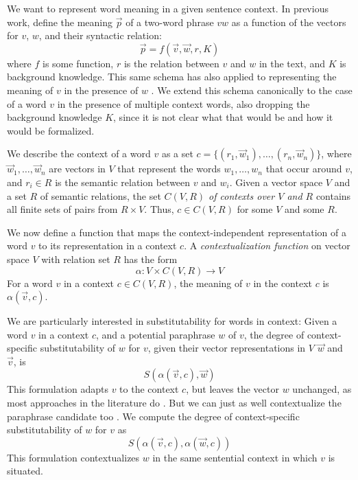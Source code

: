 We want to represent word meaning in a given sentence context.
In previous work, \citet{MitchellLapata:08} define the meaning $\vec p$ of a
two-word phrase $vw$ as a function of the vectors for $v$, $w$, and their
syntactic relation:
\[\vec p = f(\vec v, \vec w, r, K) \] where $f$ is some function, $r$ is the
relation between $v$ and $w$ in the text, and $K$ is background knowledge. This
same schema has also applied to representing the meaning of $v$ in the presence
of $w$ \citep{erk:emnlp08}. We extend this schema canonically to the case of a
word $v$ in the presence of multiple context words, also dropping the background
knowledge $K$, since it is not clear what that would be and how it would be
formalized.

We describe the context of a word $v$ as a set $c = \{(r_1, \vec w_1), \ldots,
(r_n, \vec w_n)\}$, where $\vec w_1, \ldots, \vec w_n$ are vectors in $V$ that
represent the words $w_1, \ldots, w_n$ that occur around $v$, and
$r_i \in R$ is the semantic relation between $v$ and $w_i$.
Given a vector space $V$ and a set $R$ of semantic relations, the set
\textit{$C(V, R)$ of contexts over $V$ and $R$} contains all finite sets of
pairs from $R \times V$.  Thus, $c \in C(V,R)$ for some $V$ and some $R$.

We now define a function that maps the context-independent representation of a
word $v$ to its representation in a context $c$.
A \textit{contextualization function} on vector space $V$ with relation set $R$
has the form \[ \alpha: V \times C(V, R) \to V \] For a word $v$ in a context $c
\in C(V, R)$, the meaning of $v$ in the context $c$ is $\alpha(\vec v, c)$.

We are particularly interested in substitutability for words in context: Given a
word $v$ in a context $c$, and a potential paraphrase $w$ of $v$, the degree of
context-specific substitutability of $w$ for $v$, given their vector
representations in $V$ $\vec w$ and $\vec v$, is \[ S(\alpha(\vec v, c), \vec
w)\] This formulation adapts $v$ to the context $c$, but leaves the vector $w$ 
unchanged, as most approaches in the literature do 
\citep{erk:emnlp08,MitchellLapata:08,ThaterFuerstenauPinkal:10,vandecruys:emnlp2011}.
But we can just as well contextualize the paraphrase candidate
too \citep{erk:acl2010}. We compute the degree of context-specific
substitutability of $w$ for $v$ as \[ S(\alpha(\vec v, c), \alpha(\vec w, c)) \]
This formulation contextualizes $w$ in the same sentential context in which $v$
is situated.


